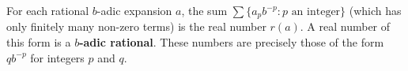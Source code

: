 For each rational $b$-adic expansion $a$, the sum $\sum \{a_p b^{-p} : p \text{ an integer}\}$ (which has only finitely many non-zero terms) is the real number $r(a)$. A real number of this form is a \textbf{$b$-adic rational}. These numbers are precisely those of the form $q b^{-p}$ for integers $p$ and $q$.
